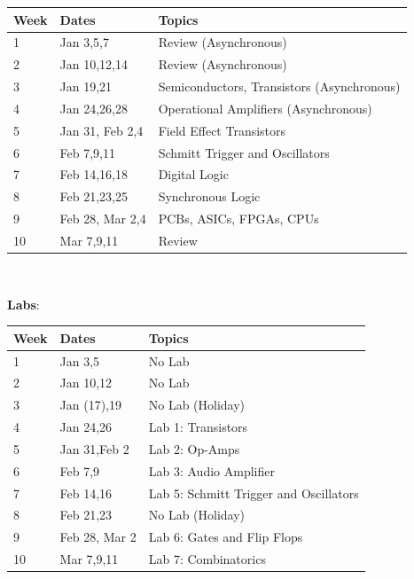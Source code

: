 \documentclass[12pt]{article}
\begin{document}
\begin{tabular}{lll}
\textbf{Week} & \textbf{Dates} & \textbf{Topics} \\
\hline
1  & Jan 3,5,7       & Review (Asynchronous) \\
2  & Jan 10,12,14    & Review (Asynchronous) \\
3  & Jan 19,21       & Semiconductors, Transistors (Asynchronous)\\
4  & Jan 24,26,28    & Operational Amplifiers (Asynchronous)\\
5  & Jan 31, Feb 2,4 & Field Effect Transistors\\
6  & Feb 7,9,11      & Schmitt Trigger and Oscillators\\
7  & Feb 14,16,18    & Digital Logic \\
8  & Feb 21,23,25    & Synchronous Logic\\
9  & Feb 28, Mar 2,4 & PCBs, ASICs, FPGAs, CPUs\\
10 & Mar 7,9,11      & Review\\
\hline
\end{tabular}\\ \vskip 1cm

\noindent
\textbf {Labs}:\\

\begin{tabular}{lll}
\textbf{Week} & \textbf{Dates} & \textbf{Topics} \\
\hline
1  & Jan 3,5         & No Lab \\
2  & Jan 10,12       & No Lab \\ 
3  & Jan (17),19     & No Lab (Holiday)\\
4  & Jan 24,26       & Lab 1: Transistors\\
5  & Jan 31,Feb 2    & Lab 2: Op-Amps\\
6  & Feb 7,9         & Lab 3: Audio Amplifier\\
7  & Feb 14,16       & Lab 5: Schmitt Trigger and Oscillators\\
8  & Feb 21,23       & No Lab (Holiday)\\
9  & Feb 28, Mar 2   & Lab 6: Gates and Flip Flops\\
10 & Mar 7,9,11      & Lab 7: Combinatorics \\
\hline
\end{tabular} 
\end{document}
